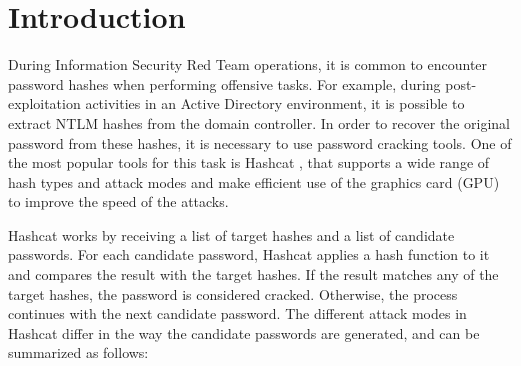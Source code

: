 \documentclass[sigconf,authordraft]{acmart}
\begin{document}


\maketitle

\section{Introduction}
During Information Security Red Team operations, it is common to encounter password hashes when performing offensive tasks.
For example, during post-exploitation activities in an Active Directory environment, it is possible to extract NTLM hashes from the domain controller.
In order to recover the original password from these hashes, it is necessary to use password cracking tools.
One of the most popular tools for this task is Hashcat \cite{hashcat},
that supports a wide range of hash types and attack modes and make efficient use of the graphics card (GPU) to improve the speed of the attacks.

Hashcat works by receiving a list of target hashes and a list of candidate passwords.
For each candidate password, Hashcat applies a hash function to it and compares the result with the target hashes.
If the result matches any of the target hashes, the password is considered cracked.
Otherwise, the process continues with the next candidate password.
The different attack modes in Hashcat differ in the way the candidate passwords are generated, and can be summarized as follows:
\end{document}
